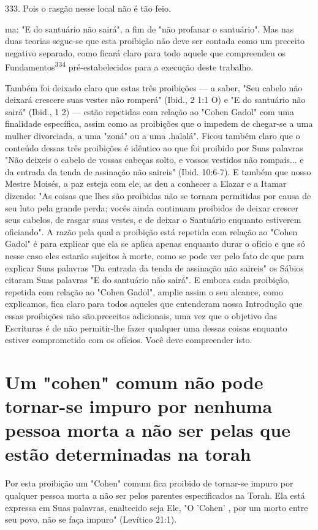 \begin{itemize}
\begin{enumrate}
\begin{itemize}
\begin{itemize}
\begin{itemize}
333. Pois o rasgão nesse local não é tão feio.

ma: "E do santuário não sairá", a fim de "não profanar o santuário". Mas
nas duas teorias segue-se que esta proibição não deve ser contada como
um precei­to negativo separado, como ficará claro para todo aquele que
compreendeu os Fundamentos\textsuperscript{334} pré-estabelecidos para a
execução deste trabalho.

Também foi deixado claro que estas três proibições --- a saber, "Seu
cabelo não deixará crescere suas vestes não romperá" (Ibid., 2 1:1 O) e
"E do santuário não sairá" (Ibid., 1 2) --- estão repetidas com relação
ao "Cohen Ga­dol" com uma finalidade específica, assim como as
proibições que o impedem de chegar-se a uma mulher divorciada, a uma
"zoná" ou a uma .halalá". Ficou também claro que o
conteúdo dessas três proibições é idêntico ao que foi proi­bido por Suas
palavras "Não deixeis o cabelo de vossas cabeças solto, e vossos
vestidos não rompais... e da entrada da tenda de assinação não saireis"
(Ibid. 10:6-7). E também que nosso Mestre Moisés, a paz esteja com ele,
as deu a co­nhecer a Elazar e a Itamar dizendo: "As coisas que lhes são
proibidas não se tornam permitidas por causa de seu luto pela grande
perda; vocês ainda conti­nuam proibidos de deixar crescer seus cabelos,
de rasgar suas vestes, e de dei­xar o Santuário enquanto estiverem
oficiando". A razão pela qual a proibição está repetida com relação ao
"Cohen Gadol" é para explicar que ela se aplica apenas enquanto durar o
ofício e que só nesse caso eles estarão sujeitos à mor­te, como se pode
ver pelo fato de que para explicar Suas palavras "Da entrada da tenda de
assinação não saireis" os Sábios citaram Suas palavras "E do san­tuário
não sairá". E embora cada proibição, repetida com relação ao "Cohen
Gadol", amplie assim o seu alcance, como explicamos, fica claro para
todos aqueles que entenderam nossa Introdução que essas proibições não
são.precei­tos adicionais, uma vez que o objetivo das
Escrituras é de não permitir-lhe fa­zer qualquer uma dessas coisas
enquanto estiver comprometido com os ofícios. Você deve compreender
isto.

\section{Um "cohen" comum não pode tornar-se impuro por nenhuma pessoa morta
a não ser pelas que estão determinadas na torah}

Por esta proibição um "Cohen" comum fica proibido de tornar-se impuro
por qualquer pessoa morta a não ser pelos parentes especificados na
Torah. Ela está expressa em Suas palavras, enaltecido seja Ele, "O
'Cohen' , por um morto entre seu povo, não se faça impuro" (Levítico
21:1).


\end{itemize}
\end{itemize}
\end{itemize}
\end{enumrate}
\end{itemize}
